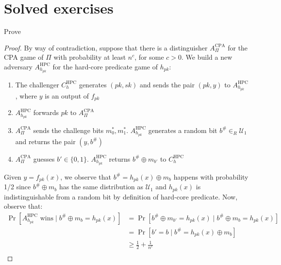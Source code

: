 \documentclass[a4paper, 12pt]{report}
\begin{document}
    \section{Solved exercises}

    \begin{framedprob}[label={cpa_tdp_ex}]{}
        Prove 
    \end{framedprob}

    \begin{proof}
        By way of contradiction, suppose that there is a distinguisher $A^{\text{CPA}}_{\Pi}$ for the CPA game of $\Pi$ with probability at least $n^{c}$, for some $c > 0$. We build a new adversary $A^{\text{HPC}}_{h_{pk}}$ for the hard-core predicate game of $h_{pk}$:
        \begin{enumerate}
            \item The challenger $C^{\text{HPC}}_h$ generates $(pk, sk)$ and sends the pair $(pk, y)$ to $A^{\text{HPC}}_{h_{pk}}$, where $y$ is an output of $f_{pk}$
            \item $A^{\text{HPC}}_{h_{pk}}$ forwards $pk$ to $A^{\text{CPA}}_{\Pi}$
            \item $A^{\text{CPA}}_{\Pi}$ sends the challenge bits $m_0^*, m_1^*$. $A^{\text{HPC}}_{h_{pk}}$ generates a random bit $b^{\#} \in_R \mathcal{U}_1$ and returns the pair $(y, b^{\#})$
            \item $A^{\text{CPA}}_{\Pi}$ guesses $b' \in \{0,1\}$. $A^{\text{HPC}}_{h_{pk}}$ returns $b^{\#} \oplus m_{b'}$ to $C^{\text{HPC}}_h$
        \end{enumerate}

        Given $y = f_{pk}(x)$, we observe that $b^{\#} = h_{pk}(x) \oplus m_b$ happens with probability 1/2 since $b^{\#} \oplus m_b$ has the same distribution as $\mathcal{U}_1$ and $h_{pk}(x)$ is indistinguishable from a random bit by definition of hard-core predicate. Now, observe that:
        \[\begin{split}
            \Pr[\text{$A^{\text{HPC}}_{h_{pk}}$ wins} \mid b^{\#} \oplus m_b = h_{pk}(x)] &= \Pr[b^{\#} \oplus m_{b'} = h_{pk}(x) \mid b^{\#} \oplus m_b = h_{pk}(x)] \\
            &= \Pr[b' = b \mid b^{\#} = h_{pk}(x) \oplus m_b] \\
            &\geq \frac{1}{2}+\frac{1}{n^c} \\
        \end{split}\] 


\end{proof}
\end{document}
